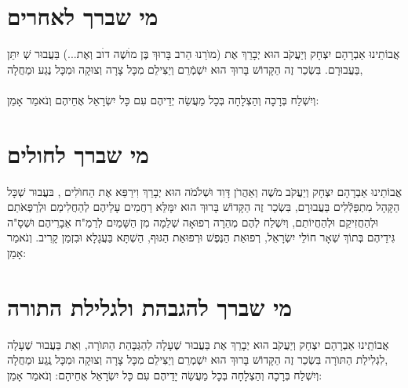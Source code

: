 \documentclass[a4paper, twoside, openany, parskip=half, 11pt]{article}
\begin{document}
\section*{מי שברך לאחרים}
 אֲבוֹתֵינוּ אַבְרָהָם יִצְחָק וְיַעֲקֹב הוּא יְבָרֵךְ אֶת (מוׂרֵנוּ הַרב בָּרוּךְ בֶּן מוׄשֶׁה דוׄב וְאֶת...) בַּעֲבוּר  שְׁ
  יִתֵּן 
   בַּעֲבוּרָם. בִּשְׂכַר זֶה הַקָּדוֹשׁ בָּרוּךְ הוּא יִשְׁמְֿרֵם וְיַצִּילֵם מִכָּל צָרָה וְצוּקָה וּמִכָּל נֶגַע וּמַחֲלָה,\\
  \\
  וְיִשְׁלַח בְּרָכָה וְהַצְלָחָה בְּכָל מַעֲשֵׂה יְדֵיהֶם עִם כָּל יִשְׂרָאֵל אֶחֵיהֶם וְנֹאמַר אָמֵן:

\section*{מי שברך לחולים}
 אֲבוֹתֵינוּ אַבְרָהָם יִצְחָק וְיַעֲקֹב מֹשֶׁה וְאַהֲרֹן דָּוִד וּשְׁלֹמֹה הוּא יְבָרֵךְ וִירַפֵּא אֶת הַחוׂלִים 
,
בּעֲבוּר שְׁכָּל הַקָּהָל מִתְפַּלְֿלִים בַּעֲבוּרָם,  בִּשְׂכַר זֶה
 הַקָּדוֹשׁ בָּרוּךְ הוּא יִמָּלֵּא רַחֲמִים עָלֵיהֶם לְהַחֲלִימַם וּלְרַפְּאֹתַם וּלְהַחֲזִיקַם וּלְהַחֲיוֹתַם, וְיִשְׁלַח לְהֶם מְהֵרָה רְפוּאָה שְׁלֵמָה מִן הַשָּׁמַיִם לְרַמַ"ח אֵבָרֵיהֶם וּשְׁסָ"ה גִּידֵיהֶם בְּתוֹךְ שְׁאָר חוֹלֵי יִשְׂרָאֵל, רְפוּאַת הַנֶּפֶשׁ וּרְפוּאַת הַגּוּף,
  הַשְׁתָּא בַּעֲגָלָא וּבִזְמַן קָרִיב. וְנֹאמַר אָמֵן:

\section*{מי שברך להגבהת ולגלילת התורה}
 אֲבוֹתֵֽינוּ אַבְרָהָם יִצְחָק וְיַעֲקֹב הוּא יְבָרֵךְ אֶת 
  בַּעֲבוּר שֶׁעָלָה לִהַגְּבָּהַת הַתּוׂרָה, וֽאֶת 
   בַּעֲבוּר שֶׁעָלָה לִגְלִילַת הַתּוׂרָה
 בִּשְׂכַר זֶה הַקָּדוֹשׁ בָּרוּךְ הוּא יִשְׁמְרֵם וְיַצִּילֵם מִכָּל צָרָה וְצוּקָה וּמִכָּל נֶֽגַע וּמַחֲלָה,
 \\
וְיִשְׁלַח בְּרָכָה וְהַצְלָחָה בְּכָל מַעֲשֵׂה יָדֵיהֶם
  עִם כָּל יִשְׂרָאֵל אֶחֵיהָם: וְנֹאמַר אָמֵן:
\end{document}
